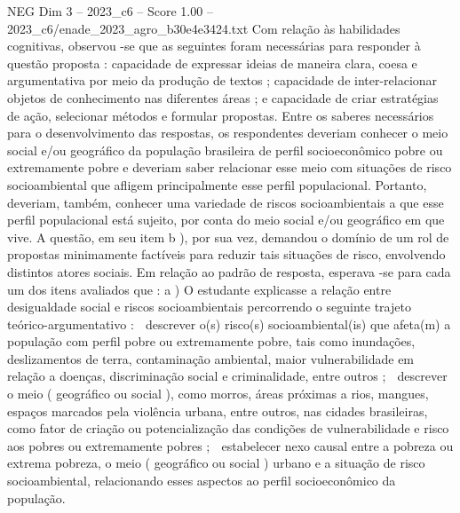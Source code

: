 \begin{textsample}{NEG Dim 3 – 2023\_c6 – Score 1.00 – 2023\_c6/enade\_2023\_agro\_b30e4e3424.txt}
Com relação às habilidades cognitivas, observou -se que as seguintes foram necessárias para responder à questão proposta : capacidade de expressar ideias de maneira clara, coesa e argumentativa por meio da produção de textos ; capacidade de inter-relacionar objetos de conhecimento nas diferentes áreas ; e capacidade de criar estratégias de ação, selecionar métodos e formular propostas.
Entre os saberes necessários para o desenvolvimento das respostas, os respondentes deveriam conhecer o meio social e/ou geográfico da população brasileira de perfil socioeconômico pobre ou extremamente pobre e deveriam saber relacionar esse meio com situações de risco socioambiental que afligem principalmente esse perfil populacional.
Portanto, deveriam, também, conhecer uma variedade de riscos socioambientais a que esse perfil populacional está sujeito, por conta do meio social e/ou geográfico em que vive.
A questão, em seu item b ), por sua vez, demandou o domínio de um rol de propostas minimamente factíveis para reduzir tais situações de risco, envolvendo distintos atores sociais.
Em relação ao padrão de resposta, esperava -se para cada um dos itens avaliados que : a ) O estudante explicasse a relação entre desigualdade social e riscos socioambientais percorrendo o seguinte trajeto teórico-argumentativo :  descrever o(s) risco(s) socioambiental(is) que afeta(m) a população com perfil pobre ou extremamente pobre, tais como inundações, deslizamentos de terra, contaminação ambiental, maior vulnerabilidade em relação a doenças, discriminação social e criminalidade, entre outros ;  descrever o meio ( geográfico ou social ), como morros, áreas próximas a rios, mangues, espaços marcados pela violência urbana, entre outros, nas cidades brasileiras, como fator de criação ou potencialização das condições de vulnerabilidade e risco aos pobres ou extremamente pobres ;  estabelecer nexo causal entre a pobreza ou extrema pobreza, o meio ( geográfico ou social ) urbano e a situação de risco socioambiental, relacionando esses aspectos ao perfil socioeconômico da população.

\end{textsample}
